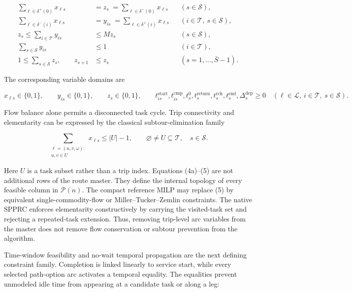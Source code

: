 \documentclass[
  11pt,
]{article}
\begin{document}
\[
\begin{aligned}
\sum_{\ell\in\delta^+(0)}x_{\ell s}
&=z_s
\;=\sum_{\ell\in\delta^-(0)}x_{\ell s}
&& (s\in\mathcal{S}),\\
\sum_{\ell\in\delta^-(i)}x_{\ell s}
&=y_{is}
\;=\sum_{\ell\in\delta^+(i)}x_{\ell s}
&& (i\in\mathcal{T},\ s\in\mathcal{S}),\\
z_s\le \sum_{i\in\mathcal{T}}y_{is}
&\le Mz_s
&& (s\in\mathcal{S}),\\
\sum_{s\in\mathcal{S}}y_{is}
&\le 1
&& (i\in\mathcal{T}),\\
1\le\sum_{s\in\mathcal{S}}z_s,\qquad
z_{s+1}&\le z_s
&& (s=1,\ldots,\bar S-1).
\end{aligned}
\tag{4a}
\]

The corresponding variable domains are

\[
x_{\ell s}\in\{0,1\},\qquad
y_{is}\in\{0,1\},\qquad
z_s\in\{0,1\},\qquad
t_{is}^{\mathrm{start}},t_{is}^{\mathrm{cmp}},
t_s^0,t_s^{\mathrm{return}},t_s^{\mathrm{rch}},t_s^{\mathrm{end}},
\Delta_s^{\mathrm{dep}}\ge 0
\quad
(\ell\in\mathcal{L},\ i\in\mathcal{T},\ s\in\mathcal{S}).
\tag{4b}
\]

Flow balance alone permits a disconnected task cycle. Trip connectivity
and elementarity can be expressed by the classical subtour-elimination
family

\[
\sum_{\substack{\ell=(u,v,\omega):\\u,v\in U}}x_{\ell s}
\le |U|-1,
\qquad
\varnothing\ne U\subseteq\mathcal{T},\quad s\in\mathcal{S}.
\tag{5}
\]

Here \(U\) is a task subset rather than a trip index. Equations
(4a)--(5) are not additional rows of the route master. They define the
internal topology of every feasible column in \(\mathcal{P}(n)\). The
compact reference MILP may replace (5) by equivalent
single-commodity-flow or Miller--Tucker--Zemlin constraints. The native
SPPRC enforces elementarity constructively by carrying the visited-task
set and rejecting a repeated-task extension. Thus, removing trip-level
arc variables from the master does not remove flow conservation or
subtour prevention from the algorithm.

Time-window feasibility and no-wait temporal propagation are the next
defining constraint family. Completion is linked linearly to service
start, while every selected path-option arc activates a temporal
equality. The equalities prevent unmodeled idle time from appearing at a
candidate task or along a leg:
\end{document}
